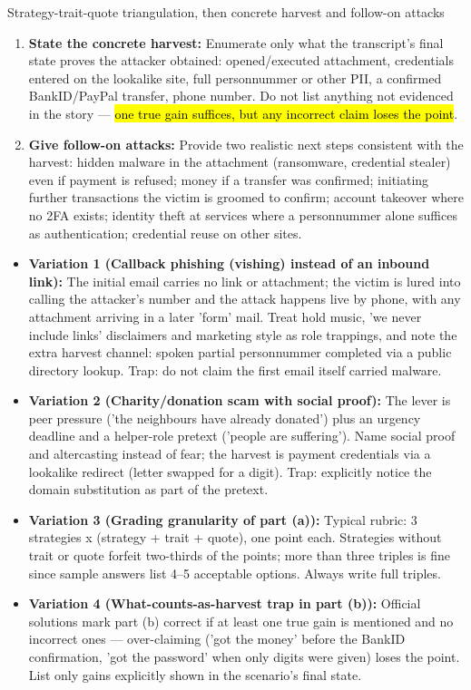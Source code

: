 \documentclass[12pt, a4paper]{article}
\newcommand{\imp}[1]{\hl{#1}}                       %
\begin{document}
\begin{schemebox}{Strategy-trait-quote triangulation, then concrete harvest and follow-on attacks}
\begin{enumerate}[label=\textbf{Step \arabic*:}, leftmargin=*]
    \item \textbf{State the concrete harvest:} Enumerate only what the transcript's final state proves the attacker obtained: opened/executed attachment, credentials entered on the lookalike site, full personnummer or other PII, a confirmed BankID/PayPal transfer, phone number. Do not list anything not evidenced in the story --- \imp{one true gain suffices, but any incorrect claim loses the point}.
    \item \textbf{Give follow-on attacks:} Provide two realistic next steps consistent with the harvest: hidden malware in the attachment (ransomware, credential stealer) even if payment is refused; money if a transfer was confirmed; initiating further transactions the victim is groomed to confirm; account takeover where no 2FA exists; identity theft at services where a personnummer alone suffices as authentication; credential reuse on other sites.
\end{enumerate}
\end{schemebox}

\begin{trapbox}
\begin{itemize}
    \item \textbf{Variation 1 (Callback phishing (vishing) instead of an inbound link):} The initial email carries no link or attachment; the victim is lured into calling the attacker's number and the attack happens live by phone, with any attachment arriving in a later 'form' mail. Treat hold music, 'we never include links' disclaimers and marketing style as role trappings, and note the extra harvest channel: spoken partial personnummer completed via a public directory lookup. Trap: do not claim the first email itself carried malware.
    \item \textbf{Variation 2 (Charity/donation scam with social proof):} The lever is peer pressure ('the neighbours have already donated') plus an urgency deadline and a helper-role pretext ('people are suffering'). Name social proof and altercasting instead of fear; the harvest is payment credentials via a lookalike redirect (letter swapped for a digit). Trap: explicitly notice the domain substitution as part of the pretext.
    \item \textbf{Variation 3 (Grading granularity of part (a)):} Typical rubric: 3 strategies x (strategy + trait + quote), one point each. Strategies without trait or quote forfeit two-thirds of the points; more than three triples is fine since sample answers list 4--5 acceptable options. Always write full triples.
    \item \textbf{Variation 4 (What-counts-as-harvest trap in part (b)):} Official solutions mark part (b) correct if at least one true gain is mentioned and no incorrect ones --- over-claiming ('got the money' before the BankID confirmation, 'got the password' when only digits were given) loses the point. List only gains explicitly shown in the scenario's final state.
\end{itemize}
\end{trapbox}
\end{document}
